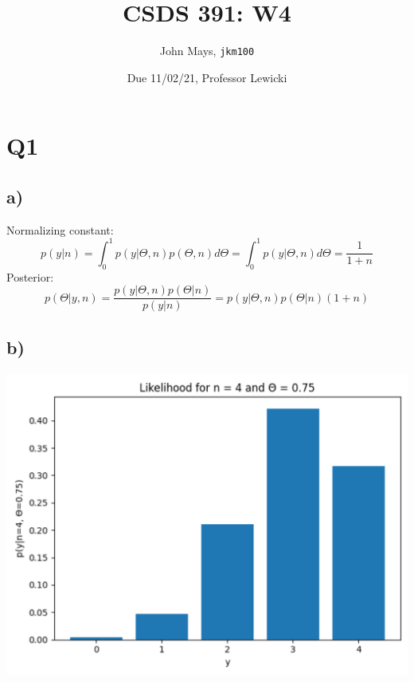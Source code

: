 \documentclass[]{article}
\title{\textbf{CSDS 391: W4}}
\author{John Mays, \texttt{jkm100}}
\date{Due 11/02/21, Professor Lewicki}
\begin{document}
\maketitle

\newcommand{\st}{\text{ s.t. }}
\newcommand{\false}{\textbf{F}}

\section*{Q1}
\subsection*{a)}
Normalizing constant:
$$p(y|n)=\int^{1}_0 p(y|\Theta, n)p(\Theta,n)d\Theta=\int^{1}_0 p(y|\Theta, n)d\Theta=\frac{1}{1+n}$$
Posterior:
$$p(\Theta|y,n)=\frac{p(y|\Theta, n)p(\Theta|n)}{p(y|n)}=p(y|\Theta, n)p(\Theta|n)(1+n)$$
\subsection*{b)}
\begin{center}
    \includegraphics[scale = 0.5]{1_b.png}
\end{center}
\pagebreak
\end{document}

